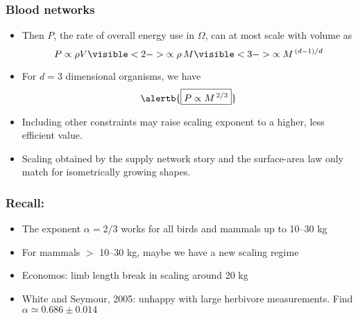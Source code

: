 \begin{frame}
  \frametitle{Blood networks}

  \begin{block}{}
    \begin{itemize}
    \item<1-> Then $P$, the rate of overall energy 
      use in $\Omega$, can at most scale with volume as
      $$
      P \propto \rho V 
      \visible<2->{
        \propto \rho \, M
      }
      \visible<3->{
        \propto M^{\, (d-1)/d}
      }
      $$
    \item<4-> 
      For $d=3$ dimensional organisms, we have 
      $$\alertb{\boxed{ P \propto M^{\, 2/3}}}$$
    \item<5-> 
      Including other constraints may raise scaling exponent
      to a higher, less efficient value.
    \item<6->
      Scaling obtained by the supply network story and the surface-area law
      \alert{only match} for isometrically growing shapes.\\
    \end{itemize}    
  \end{block}

\end{frame}

\begin{frame}
  \frametitle{Recall:}

  \begin{block}{}
  \begin{itemize}
  \item<+-> 
    The exponent $\alpha = 2/3$ works for all birds and
    mammals up to 10--30 kg
  \item<+-> 
    For mammals $>$ 10--30 kg, maybe we have a new scaling regime
  \item<+-> 
    Economos: limb length break in scaling around 20 kg
  \item<+-> 
    White and Seymour, 2005: unhappy with large herbivore measurements.
    Find $\alpha \simeq 0.686 \pm 0.014$
  \end{itemize}
  \end{block}

\end{frame}

